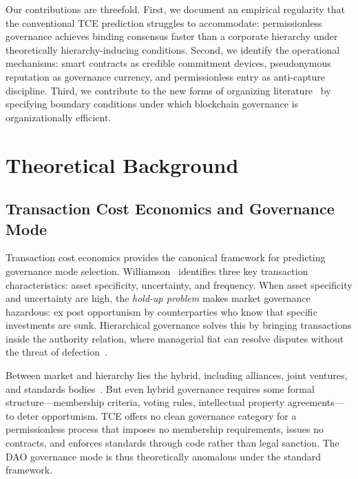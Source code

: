 \documentclass[conference]{IEEEtran}
\begin{document}
Our contributions are threefold. First, we document an empirical regularity
that the conventional TCE prediction struggles to accommodate: permissionless
governance achieves binding consensus faster than a corporate hierarchy
under theoretically hierarchy-inducing conditions. Second, we identify the
operational mechanisms: smart contracts as credible commitment devices,
pseudonymous reputation as governance currency, and permissionless entry
as anti-capture discipline. Third, we contribute to the new forms of organizing
literature~\cite{puranam2014} by specifying boundary conditions under which
blockchain governance is organizationally efficient.


\section{Theoretical Background}

\subsection{Transaction Cost Economics and Governance Mode}

Transaction cost economics provides the canonical framework for predicting
governance mode selection. Williamson~\cite{williamson1985} identifies three
key transaction characteristics: asset specificity, uncertainty, and frequency.
When asset specificity and uncertainty are high, the \textit{hold-up problem}
makes market governance hazardous: ex post opportunism by counterparties who
know that specific investments are sunk. Hierarchical governance solves
this by bringing transactions inside the authority relation, where managerial
fiat can resolve disputes without the threat of defection~\cite{williamson1991}.

Between market and hierarchy lies the hybrid, including alliances, joint
ventures, and standards bodies~\cite{gulati1998}. But even hybrid governance
requires some formal structure---membership criteria, voting rules, intellectual
property agreements---to deter opportunism. TCE offers no clean governance
category for a permissionless process that imposes no membership requirements,
issues no contracts, and enforces standards through code rather than legal
sanction. The DAO governance mode is thus theoretically anomalous under the
standard framework.
\end{document}
